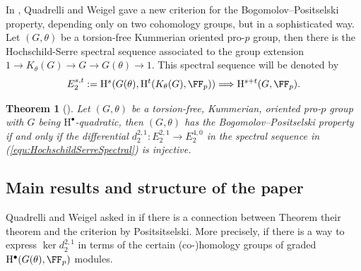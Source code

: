 \documentclass{amsart}
\newtheorem*{thm*}{Theorem}
\theoremstyle{definition}
\theoremstyle{remark}
\newcommand{\rmH}{\mathrm{H}}
\numberwithin{equation}{section}
\begin{document}
In \cite{QuadrelliWeigel2022}, Quadrelli and Weigel gave a new criterion for the Bogomolov--Positselski property, depending only on two cohomology groups, but in a sophisticated way. Let $(G,\theta)$ be a torsion-free Kummerian oriented pro-$p$ group, then there is the Hochschild-Serre spectral sequence associated to the group extension $1\to K_\theta(G)\to G\to G(\theta)\to 1$.
This spectral sequence will be denoted by 
\begin{align}
\label{equ:HochschildSerreSpectral}
    E_2^{s,t}:=\rmH^s(G(\theta),\rmH^t(K_\theta(G),\FF_p))\Longrightarrow \rmH^{s+t}(G,\FF_p).
\end{align}
\begin{thm*}[{\cite[Theorem 4.5]{QuadrelliWeigel2022}}]
\label{thm:QuadrelliWeigel_BPC}
    Let $(G,\theta)$ be a torsion-free, Kummerian, oriented pro-$p$ group with $G$ being $\rmH^\bullet$-quadratic, then $(G,\theta)$ has the Bogomolov--Positselski property if and only if the differential $d_2^{2,1}:E^{2,1}_2\to E^{4,0}_2$ in the spectral sequence in (\ref{equ:HochschildSerreSpectral}) is injective.
\end{thm*}

\subsection{Main results and structure of the paper}
Quadrelli and Weigel asked in \cite[Remark 1.5]{QuadrelliWeigel2022} if there is a connection between Theorem their theorem and the criterion by Positsitselski. More precisely, if there is a way to express $\ker d_2^{2,1}$ in terms of the certain (co-)homology groups of graded $\rmH^\bullet(G(\theta),\FF_p)$ modules.
\end{document}
